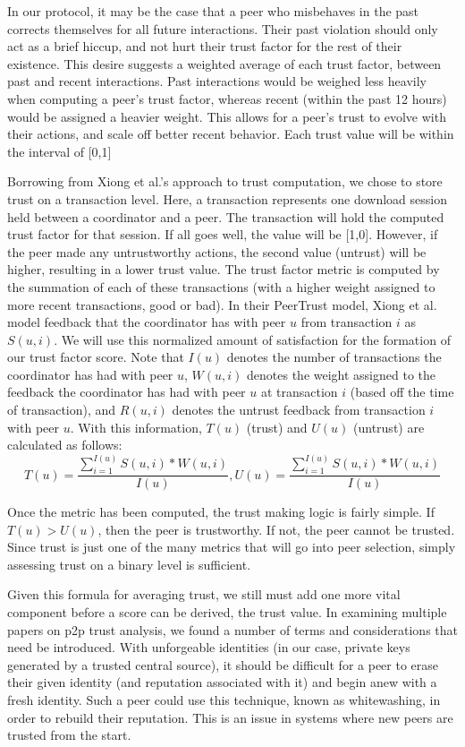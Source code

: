 \documentclass[12pt]{article}
\begin{document}
			In our protocol, it may be the case that a peer who misbehaves in the past corrects themselves for all future interactions. Their past violation should only act as a brief hiccup, and not hurt their trust factor for the rest of their existence. This desire suggests a weighted average of each trust factor, between past and recent interactions. Past interactions would be weighed less heavily when computing a peer's trust factor, whereas recent (within the past 12 hours) would be assigned a heavier weight. This allows for a peer's trust to evolve with their actions, and scale off better recent behavior. Each trust value will be within the interval of [0,1]

			Borrowing from Xiong et al.'s approach to trust computation, we chose to store trust on a transaction level. Here, a transaction represents one download session held between a coordinator and a peer. The transaction will hold the computed trust factor for that session. If all goes well, the value will be [1,0]. However, if the peer made any untrustworthy actions, the second value (untrust) will be higher, resulting in a lower trust value. The trust factor metric is computed by the summation of each of these transactions (with a higher weight assigned to more recent transactions, good or bad). In their PeerTrust model, Xiong et al. model feedback that the coordinator has with peer $u$ from transaction $i$ as $S(u,i)$. We will use this normalized amount of satisfaction for the formation of our trust factor score. Note that $I(u)$ denotes the number of transactions the coordinator has had with peer $u$, $W(u,i)$ denotes the weight assigned to the feedback the coordinator has had with peer $u$ at transaction $i$ (based off the time of transaction), and $R(u,i)$ denotes the untrust feedback from transaction $i$ with peer $u$. With this information, $T(u)$ (trust) and $U(u)$ (untrust) are calculated as follows:
			$$
				T(u) = \frac{\sum\limits_{i=1}^{I(u)} S(u,i) * W(u,i)}{I(u)},
				U(u) = \frac{\sum\limits_{i=1}^{I(u)} S(u,i) * W(u,i)}{I(u)}
			$$

			Once the metric has been computed, the trust making logic is fairly simple. If $T(u) > U(u)$, then the peer is trustworthy. If not, the peer cannot be trusted. Since trust is just one of the many metrics that will go into peer selection, simply assessing trust on a binary level is sufficient. 

			Given this formula for averaging trust, we still must add one more vital component before a score can be derived, the trust value. In examining multiple papers on p2p trust analysis, we found a number of terms and considerations that need be introduced. With unforgeable identities (in our case, private keys generated by a trusted central source), it should be difficult for a peer to erase their given identity (and reputation associated with it) and begin anew with a fresh identity. Such a peer could use this technique, known as whitewashing, in order to rebuild their reputation. This is an issue in systems where new peers are trusted from the start.
\end{document}
